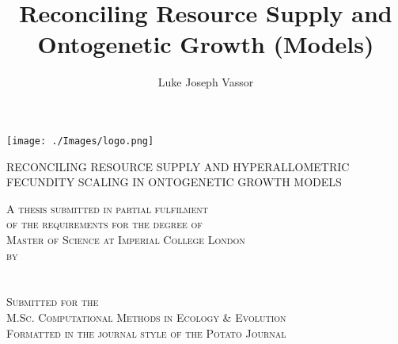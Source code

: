 \documentclass[a4paper]{article} %
\title{Reconciling Resource Supply and Ontogenetic Growth (Models)}
\author{Luke Joseph Vassor}
\begin{document}
\begin{titlepage}
    
    \texttt{[image: ./Images/logo.png]}\\%
     
    
    \center %
    
    
    \makeatletter
    \linespread{1.5} %
        {\huge{RECONCILING RESOURCE SUPPLY AND HYPERALLOMETRIC FECUNDITY SCALING IN ONTOGENETIC GROWTH MODELS}\par} %
    \vspace{2.5cm} %

    \textsc{A thesis submitted in partial fulfilment \\ of the requirements for the degree of \\ Master of Science at Imperial College London \\ by \\ \ }\\[2.5cm]
    \textsc{\Large \@author}\\[2.5cm]
    \textsc{Submitted for the \\ M.Sc. Computational Methods in Ecology \& Evolution \\ Formatted in the journal style of the Potato Journal \\ \ }\\[2cm]


\end{titlepage}
\end{document}
